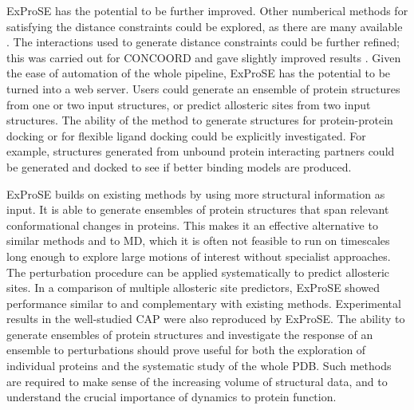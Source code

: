 ExProSE has the potential to be further improved.
Other numberical methods for satisfying the distance constraints could be explored, as there are many available \cite{DeBakker2006}.
The interactions used to generate distance constraints could be further refined; this was carried out for CONCOORD and gave slightly improved results \cite{DeGroot1999}.
Given the ease of automation of the whole pipeline, ExProSE has the potential to be turned into a web server.
Users could generate an ensemble of protein structures from one or two input structures, or predict allosteric sites from two input structures.
The ability of the method to generate structures for protein-protein docking or for flexible ligand docking could be explicitly investigated.
For example, structures generated from unbound protein interacting partners could be generated and docked to see if better binding models are produced.

ExProSE builds on existing methods by using more structural information as input.
It is able to generate ensembles of protein structures that span relevant conformational changes in proteins.
This makes it an effective alternative to similar methods and to MD, which it is often not feasible to run on timescales long enough to explore large motions of interest without specialist approaches.
The perturbation procedure can be applied systematically to predict allosteric sites.
In a comparison of multiple allosteric site predictors, ExProSE showed performance similar to and complementary with existing methods.
Experimental results in the well-studied CAP were also reproduced by ExProSE.
The ability to generate ensembles of protein structures and investigate the response of an ensemble to perturbations should prove useful for both the exploration of individual proteins and the systematic study of the whole PDB.
Such methods are required to make sense of the increasing volume of structural data, and to understand the crucial importance of dynamics to protein function.

